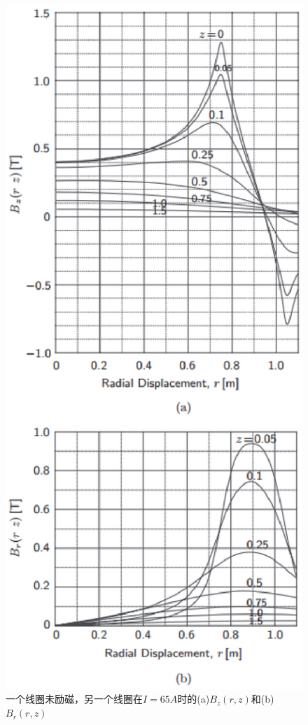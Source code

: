 \begin{figure}[htbp]
	\centering
	\includegraphics[scale=0.5]{chpt3/figs/fig3.42.eps}
	\caption{一个线圈未励磁，另一个线圈在$I=65A$时的(a)$B_z(r, z)$和(b) $B_r(r, z)$}
\end{figure}

